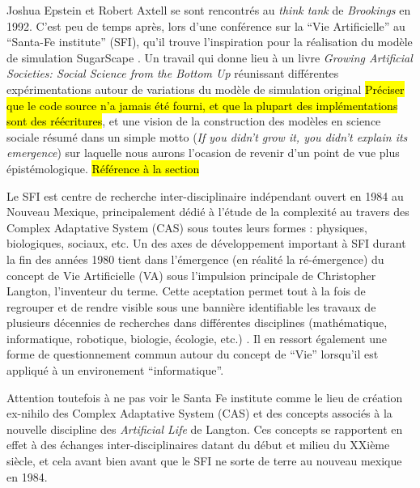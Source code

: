 Joshua Epstein et Robert Axtell se sont rencontrés au \textit{think tank} de \textit{Brookings} en 1992. C'est peu de temps après, lors d'une conférence sur la \enquote{Vie Artificielle} au \foreignquote{english}{Santa-Fe institute} (SFI), qu'il trouve l'inspiration pour la réalisation du modèle de simulation SugarScape . Un travail qui donne lieu à un livre \textit{Growing Artificial Societies: Social Science from the Bottom Up} réunissant différentes expérimentations autour de variations du modèle de simulation original \hl{Préciser que le code source n'a jamais été fourni, et que la plupart des implémentations sont des réécritures}, et une vision de la construction des modèles en science sociale résumé dans un simple motto (\textit{If you didn’t grow it, you didn’t explain its emergence}) sur laquelle nous aurons l'ocasion de revenir d'un point de vue plus épistémologique. \hl{Référence à la section}


Le SFI est centre de recherche inter-disciplinaire indépendant ouvert en 1984 au Nouveau Mexique, principalement dédié à l'étude de la complexité au travers des Complex Adaptative System (CAS) sous toutes leurs formes : physiques, biologiques, sociaux, etc. Un des axes de développement important à SFI durant la fin des années 1980 tient dans l'émergence (en réalité la ré-émergence) du concept de Vie Artificielle (VA) sous l'impulsion principale de Christopher Langton, l'inventeur du terme. Cette aceptation permet tout à la fois de regrouper et de rendre visible sous une bannière identifiable les travaux de plusieurs décennies de recherches dans différentes disciplines (mathématique, informatique, robotique, biologie, écologie, etc.)  \autocite{Taylor1999}. Il en ressort également une forme de questionnement commun autour du concept de \enquote{Vie} lorsqu'il est appliqué à un environement \enquote{informatique}.

Attention toutefois à ne pas voir le Santa Fe institute comme le lieu de création ex-nihilo des Complex Adaptative System (CAS) et des concepts associés à la nouvelle discipline des \textit{Artificial Life} de Langton. Ces concepts se rapportent en effet à des échanges inter-disciplinaires datant du début et milieu du XXième siècle, et cela avant bien avant que le SFI ne sorte de terre au nouveau mexique en 1984.

